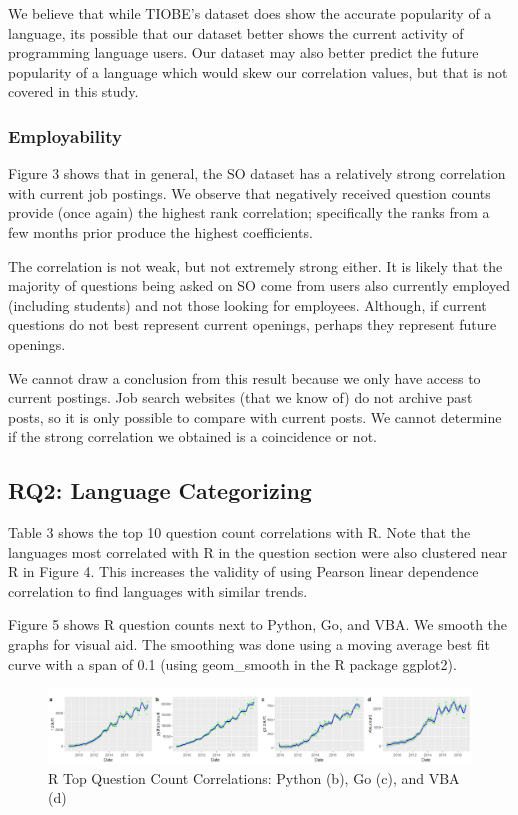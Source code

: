 \documentclass[conference]{IEEEtran}
\begin{document}
We believe that while TIOBE's dataset does show the accurate popularity of a language, its possible that our dataset better shows the current activity of programming language users. Our dataset may also better predict the future popularity of a language which would skew our correlation values, but that is not covered in this study.

\subsubsection{Employability}

Figure 3 shows that in general, the SO dataset has a relatively strong correlation with current job postings. We observe that negatively received question counts provide (once again) the highest rank correlation; specifically the ranks from a few months prior produce the highest coefficients. 

The correlation is not weak, but not extremely strong either. It is likely that the majority of questions being asked on SO come from users also currently employed (including students) and not those looking for employees. Although, if current questions do not best represent current openings, perhaps they represent future openings.

We cannot draw a conclusion from this result because we only have access to current postings. Job search websites (that we know of) do not archive past posts, so it is only possible to compare with current posts. We cannot determine if the strong correlation we obtained is a coincidence or not.

\subsection{RQ2: Language Categorizing}

Table 3 shows the top 10 question count correlations with R. Note that the languages most correlated with R in the question section were also clustered near R in Figure 4. This increases the validity of using Pearson linear dependence correlation to find languages with similar trends.

Figure 5 shows R question counts next to Python, Go, and VBA. We smooth the graphs for visual aid. The smoothing was done using a moving average best fit curve with a span of 0.1 (using geom\_smooth in the R package ggplot2). 

\begin{figure}[h]
\includegraphics[width=16cm]{Rtop4.png}
\centering
\caption{R Top Question Count Correlations: Python (b), Go (c), and VBA (d)}
\end{figure}
\end{document}
